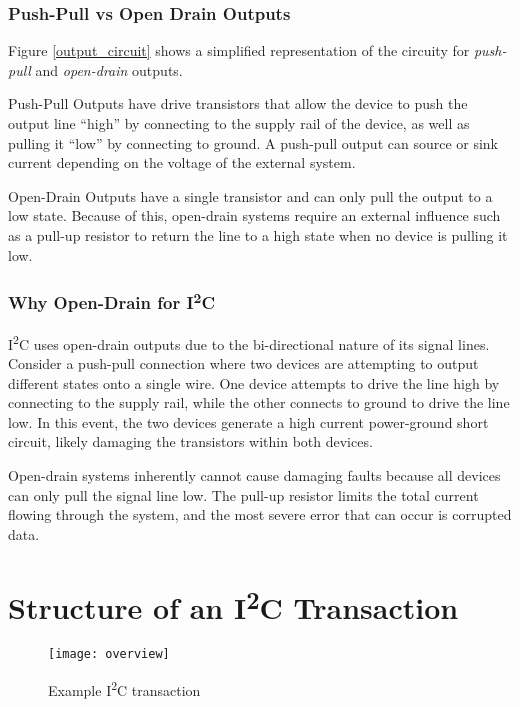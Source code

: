 \documentclass[openany,11pt,fleqn]{book} %
\begin{document}
        \subsubsection{Push-Pull vs Open Drain Outputs}
        Figure \ref{output_circuit} shows a simplified representation of the circuity for \textit{push-pull} and \textit{open-drain} outputs. 
        
        Push-Pull Outputs have drive transistors that allow the device to push the output line ``high'' by connecting to the supply rail of the device, as well as pulling it ``low'' by connecting to ground. A push-pull output can source or sink current depending on the voltage of the external system. 
        
        Open-Drain Outputs have a single transistor and can only pull the output to a low state. Because of this, open-drain systems require an external influence such as a pull-up resistor to return the line to a high state when no device is pulling it low. 
        
        \subsubsection{Why Open-Drain for I\textsuperscript{2}C}
            I\textsuperscript{2}C uses open-drain outputs due to the bi-directional nature of its signal lines. Consider a push-pull connection where two devices are attempting to output different states onto a single wire. One device attempts to drive the line high by connecting to the supply rail, while the other connects to ground to drive the line low. In this event, the two devices generate a high current power-ground short circuit, likely damaging the transistors within both devices. 
            
            Open-drain systems inherently cannot cause damaging faults because all devices can only pull the signal line low. The pull-up resistor limits the total current flowing through the system, and the most severe error that can occur is corrupted data. 

\section{Structure of an I\textsuperscript{2}C Transaction}	
    
    \begin{figure}[]
        \centering\texttt{[image: overview]}
        \caption{Example I\textsuperscript{2}C transaction}
        \label{overview}
    \end{figure}
    
\end{document}
